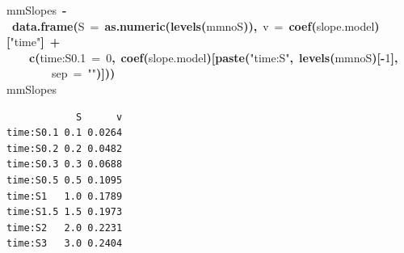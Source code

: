 \documentclass{article}
\makeatletter
\newcommand{\hlnumber}[1]{\textcolor[rgb]{0,0,0}{#1}}%
\newcommand{\hlfunctioncall}[1]{\textcolor[rgb]{0.501960784313725,0,0.329411764705882}{\textbf{#1}}}%
\newcommand{\hlstring}[1]{\textcolor[rgb]{0.6,0.6,1}{#1}}%
\newcommand{\hlkeyword}[1]{\textcolor[rgb]{0,0,0}{\textbf{#1}}}%
\newcommand{\hlargument}[1]{\textcolor[rgb]{0.690196078431373,0.250980392156863,0.0196078431372549}{#1}}%
\newcommand{\hlassignement}[1]{\textcolor[rgb]{0,0,0}{\textbf{#1}}}%
\newcommand{\hlsymbol}[1]{\textcolor[rgb]{0,0,0}{#1}}%
\newcommand{\hlstd}[1]{\textcolor[rgb]{0,0,0}{#1}}%
\newenvironment{kframe}{%
 \def\FrameCommand##1{\hskip\@totalleftmargin \hskip-\fboxsep
 \colorbox{shadecolor}{##1}\hskip-\fboxsep
     \hskip-\linewidth \hskip-\@totalleftmargin \hskip\columnwidth}%
 \MakeFramed {\advance\hsize-\width
   \@totalleftmargin\z@ \linewidth\hsize
   \@setminipage}}%
 {\par\unskip\endMakeFramed}
\newenvironment{knitrout}{}{} %
\makeatother
\begin{document}
\begin{knitrout}
\color{fgcolor}\begin{kframe}
\begin{flushleft}
\ttfamily\noindent
\hlsymbol{mmSlopes}{\ }\hlassignement{\usebox{\hlnormalsizeboxlessthan}-}{\ }\hlfunctioncall{data.frame}\hlkeyword{(}\hlargument{S}{\ }\hlargument{=}{\ }\hlfunctioncall{as.numeric}\hlkeyword{(}\hlfunctioncall{levels}\hlkeyword{(}\hlsymbol{mmno}\hlkeyword{\usebox{\hlnormalsizeboxdollar}}\hlsymbol{S}\hlkeyword{)}\hlkeyword{)}\hlkeyword{,}{\ }\hlargument{v}{\ }\hlargument{=}{\ }\hlfunctioncall{coef}\hlkeyword{(}\hlsymbol{slope.model}\hlkeyword{)}\hlkeyword{[}\hlstring{"{}time"{}}\hlkeyword{]}{\ }\hlkeyword{+}\hspace*{\fill}\\
\hlstd{}{\ }{\ }{\ }{\ }\hlfunctioncall{c}\hlkeyword{(}\hlargument{\usebox{\hlnormalsizeboxbacktick}time:S0.1\usebox{\hlnormalsizeboxbacktick}}{\ }\hlargument{=}{\ }\hlnumber{0}\hlkeyword{,}{\ }\hlfunctioncall{coef}\hlkeyword{(}\hlsymbol{slope.model}\hlkeyword{)}\hlkeyword{[}\hlfunctioncall{paste}\hlkeyword{(}\hlstring{"{}time:S"{}}\hlkeyword{,}{\ }\hlfunctioncall{levels}\hlkeyword{(}\hlsymbol{mmno}\hlkeyword{\usebox{\hlnormalsizeboxdollar}}\hlsymbol{S}\hlkeyword{)}\hlkeyword{[}\hlkeyword{-}\hlnumber{1}\hlkeyword{]}\hlkeyword{,}\hspace*{\fill}\\
\hlstd{}{\ }{\ }{\ }{\ }{\ }{\ }{\ }{\ }\hlargument{sep}{\ }\hlargument{=}{\ }\hlstring{"{}"{}}\hlkeyword{)}\hlkeyword{]}\hlkeyword{)}\hlkeyword{)}\hspace*{\fill}\\
\hlstd{}\hlsymbol{mmSlopes}\mbox{}
\normalfont
\end{flushleft}
\begin{verbatim}
            S      v
time:S0.1 0.1 0.0264
time:S0.2 0.2 0.0482
time:S0.3 0.3 0.0688
time:S0.5 0.5 0.1095
time:S1   1.0 0.1789
time:S1.5 1.5 0.1973
time:S2   2.0 0.2231
time:S3   3.0 0.2404
\end{verbatim}
\end{kframe}
\end{knitrout}
\end{document}
